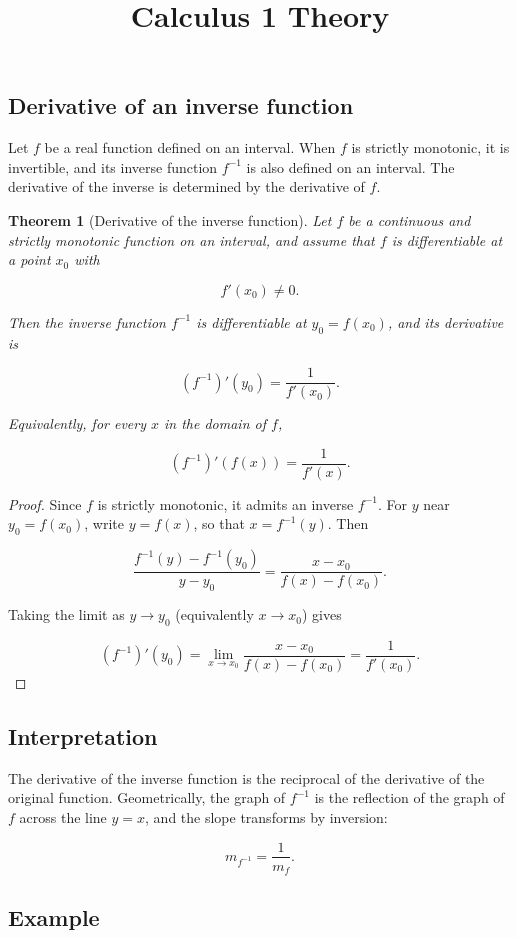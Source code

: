 \documentclass[11pt,a4paper]{article} \usepackage[T1]{fontenc}
\theoremstyle{plain} \newtheorem{theorem}{Theorem} \title{Calculus 1 Theory}
\begin{document}
\subsection {Derivative of an inverse function}

Let $f$ be a real function defined on an interval. When $f$ is strictly
monotonic, it is invertible, and its inverse function $f^{-1}$ is also defined
on an interval. The derivative of the inverse is determined by the derivative
of $f$.

\begin{theorem}
[Derivative of the inverse function] Let $f$ be a continuous and strictly
monotonic function on an interval, and assume that $f$ is differentiable at a
point $x_0$ with

\[
f'(x_0) \neq 0.
\]

Then the inverse function $f^{-1}$ is differentiable at $y_0 = f(x_0)$, and its
derivative is

\[
(f^{-1})'(y_0) = \frac{1}{f'(x_0)}.
\]

Equivalently, for every $x$ in the domain of $f$,

\[
(f^{-1})'(f(x)) = \frac{1}{f'(x)}.
\]

\end{theorem}

\begin{proof}
Since $f$ is strictly monotonic, it admits an inverse $f^{-1}$. For $y$ near
$y_0=f(x_0)$, write $y=f(x)$, so that $x=f^{-1}(y)$. Then

\[
\frac{f^{-1}(y)-f^{-1}(y_0)}{y-y_0} = \frac{x-x_0}{f(x)-f(x_0)}.
\]

Taking the limit as $y\to y_0$ (equivalently $x\to x_0$) gives

\[
(f^{-1})'(y_0) = \lim_{x\to x_0} \frac{x-x_0}{f(x)-f(x_0)} = \frac{1}{f'(x_0)}.
\]

\end{proof}

\subsection*{Interpretation}

The derivative of the inverse function is the reciprocal of the derivative of
the original function. Geometrically, the graph of $f^{-1}$ is the reflection
of the graph of $f$ across the line $y=x$, and the slope transforms by
inversion:

\[
m_{f^{-1}} = \frac{1}{m_f}.
\]

\subsection*{Example}
\end{document}
